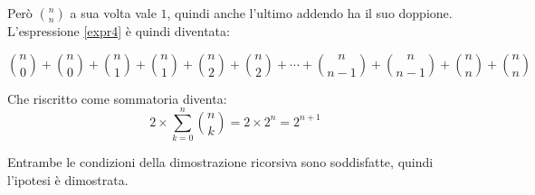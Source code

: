 Però ${n\choose n}$ a sua volta vale $1$, quindi anche l'ultimo addendo ha il suo doppione.  L'espressione \ref{expr4} è quindi diventata:

\begin{equation*}
{n\choose 0}+{n\choose 0}+
{n\choose 1}+{n\choose 1}+
{n\choose 2}+{n\choose 2}+\cdots+
{n\choose n-1}+{n\choose n-1}+
{n\choose n}+{n\choose n}
\end{equation*}

Che riscritto come sommatoria diventa:
\begin{equation*}
2\times\sum_{k=0}^n{{n\choose k}} = 2\times2^n=2^{n+1}
\end{equation*}

Entrambe le condizioni della dimostrazione ricorsiva sono soddisfatte, quindi l'ipotesi è dimostrata.

